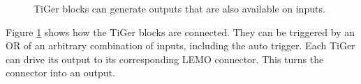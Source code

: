 % 
\begin{figure}[ht]
    \begin{center}
        \caption{TiGer blocks can generate outputs that are also available on inputs.\label{fig:matrix}} 
    \end{center}
\end{figure}
%

Figure \ref{fig:matrix} shows how the TiGer blocks are connected. They can be triggered by an OR of an arbitrary combination of inputs, 
including the auto trigger. Each TiGer can drive its output to its corresponding LEMO connector. This turns the connector into an output. 

